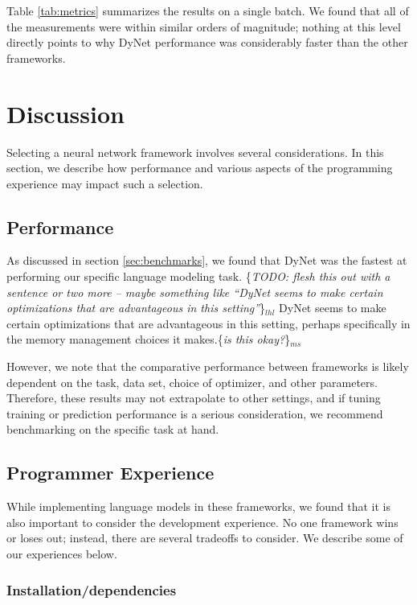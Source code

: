 \documentclass{article}
\newcommand{\ms}[1]{{\color{cyan}\{\textit{#1}\}$_{ms}$}}
\newcommand{\lhl}[1]{{\color{magenta}\{\textit{#1}\}$_{lhl}$}}
\begin{document}
Table \ref{tab:metrics} summarizes the results on a single batch. We found that all of the measurements were within similar orders of magnitude; nothing at this level directly points to why DyNet performance was considerably faster than the other frameworks.

\section{Discussion}

Selecting a neural network framework involves several considerations. In this section, we describe how performance and various aspects of the programming experience may impact such a selection.

\subsection{Performance}

As discussed in section \ref{sec:benchmarks}, we found that DyNet was the fastest at performing our specific language modeling task. \lhl{TODO: flesh this out with a sentence or two more -- maybe something like ``DyNet seems to make certain optimizations that are advantageous in this setting''}
DyNet seems to make certain optimizations that are advantageous in this setting, perhaps specifically in the memory management choices it makes.\ms{is this okay?}

However, we note that the comparative performance between frameworks is likely dependent on the task, data set, choice of optimizer, and other parameters. Therefore, these results may not extrapolate to other settings, and if tuning training or prediction performance is a serious consideration, we recommend benchmarking on the specific task at hand.

\subsection{Programmer Experience}

While implementing language models in these frameworks, we found that it is also important to consider the development experience. No one framework wins or loses out; instead, there are several tradeoffs to consider. We describe some of our experiences below.

\subsubsection{Installation/dependencies}
\end{document}
